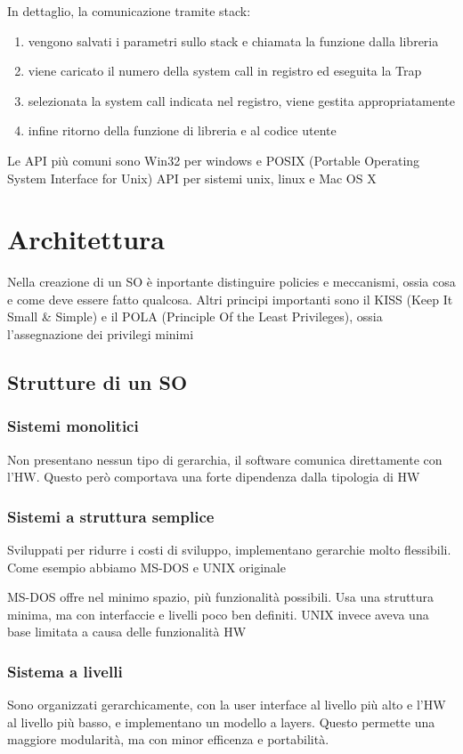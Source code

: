 \documentclass[12pt, a4paper]{article}
\begin{document}
In dettaglio, la comunicazione tramite stack:
\begin{enumerate}
    \item vengono salvati i parametri sullo stack e chiamata la funzione dalla libreria
    \item viene caricato il numero della system call in registro ed eseguita la Trap
    \item selezionata la system call indicata nel registro, viene gestita appropriatamente 
    \item infine ritorno della funzione di libreria e al codice utente
\end{enumerate}

Le API più comuni sono Win32 per windows e POSIX (Portable Operating System Interface for Unix) API per sistemi 
unix, linux e Mac OS X

\newpage
\section{Architettura}
Nella creazione di un SO è inportante distinguire policies e meccanismi, ossia cosa e come deve essere fatto
qualcosa. Altri principi importanti sono il KISS (Keep It Small \& Simple) e il POLA (Principle Of the Least 
Privileges), ossia l'assegnazione dei privilegi minimi

\subsection{Strutture di un SO}
\subsubsection{Sistemi monolitici}
Non presentano nessun tipo di gerarchia, il software comunica direttamente con l'HW. Questo però comportava una 
forte dipendenza dalla tipologia di HW

\subsubsection{Sistemi a struttura semplice}
Sviluppati per ridurre i costi di sviluppo, implementano gerarchie molto flessibili. Come esempio abbiamo MS-DOS 
e UNIX originale

MS-DOS offre nel minimo spazio, più funzionalità possibili. Usa una struttura minima, ma con interfaccie e livelli
poco ben definiti. UNIX invece aveva una base limitata a causa delle funzionalità HW

\subsubsection{Sistema a livelli}
Sono organizzati gerarchicamente, con la user interface al livello più alto e l'HW al livello più basso, e 
implementano un modello a layers. Questo permette una maggiore modularità, ma con minor efficenza e portabilità.
\end{document}
